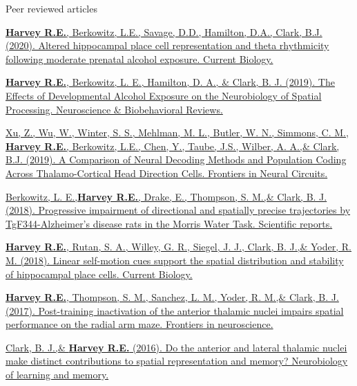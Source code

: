 


\begin{cventries}

\cventry
    {Peer reviewed articles} %
    {} %
    {} %
    {} %
    {
      \begin{cvitems} %
      \setlength\itemsep{0.5em}
            \item {\href{https://doi.org/10.1016/j.cub.2020.06.077}{\textbf{Harvey R.E.}, Berkowitz, L.E., Savage, D.D., Hamilton, D.A., Clark, B.J. (2020). Altered hippocampal place cell representation and theta rhythmicity following moderate prenatal alcohol exposure. Current Biology.}} 
            \item {\href{https://doi.org/10.1016/j.neubiorev.2019.09.018}{\textbf{Harvey R.E.}, Berkowitz, L. E., Hamilton, D. A., \& Clark, B. J. (2019). The Effects of Developmental Alcohol Exposure on the Neurobiology of Spatial Processing. Neuroscience \& Biobehavioral Reviews.}}
            \item {\href{https://doi.org/10.3389/fncir.2019.00075}{Xu, Z., Wu, W., Winter, S. S., Mehlman, M. L., Butler, W. N., Simmons, C. M., \textbf{Harvey R.E.}, Berkowitz, L.E., Chen, Y., Taube, J.S., Wilber, A. A.,\& Clark, B.J. (2019). A Comparison of Neural Decoding Methods and Population Coding Across Thalamo-Cortical Head Direction Cells. Frontiers in Neural Circuits.}}
            \item {\href{https://doi.org/10.1038/s41598-018-34368-w}{Berkowitz, L. E.,\textbf{Harvey R.E.}, Drake, E., Thompson, S. M.,\& Clark, B. J. (2018). Progressive impairment of directional and spatially precise trajectories by TgF344-Alzheimer’s disease rats in the Morris Water Task. Scientific reports.}} 
            \item {\href{https://doi.org/10.1016/j.cub.2018.04.034}{\textbf{Harvey R.E.}, Rutan, S. A., Willey, G. R., Siegel, J. J., Clark, B. J.,\& Yoder, R. M. (2018). Linear self-motion cues support the spatial distribution and stability of hippocampal place cells. Current Biology.}}
            \item {\href{https://doi.org/10.3389/fnins.2017.00094}{\textbf{Harvey R.E.}, Thompson, S. M., Sanchez, L. M., Yoder, R. M.,\& Clark, B. J. (2017). Post-training inactivation of the anterior thalamic nuclei impairs spatial performance on the radial arm maze. Frontiers in neuroscience.}} 
            \item {\href{https://doi.org/10.1016/j.nlm.2016.06.002}{Clark, B. J.,\& \textbf{Harvey R.E.} (2016). Do the anterior and lateral thalamic nuclei make distinct contributions to spatial representation and memory? Neurobiology of learning and memory.}}
      \end{cvitems}
    }
    

\end{cventries}
